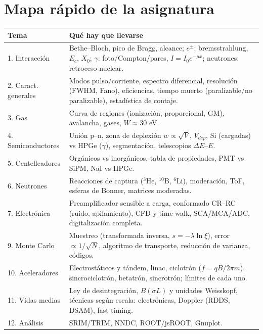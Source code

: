 \section*{Mapa rápido de la asignatura}
\begin{center}\small
\begin{tabularx}{\linewidth}{lX}
\toprule
Tema & Qué hay que llevarse \\
\midrule
1. Interacción & Bethe--Bloch, pico de Bragg, alcance; $e^\pm$: bremsstrahlung, $E_c$, $X_0$; $\gamma$: foto/Compton/pares, $I=I_0e^{-\mu x}$; neutrones: retroceso nuclear.\\
2. Caract. generales & Modos pulso/corriente, espectro diferencial, resolución (FWHM, Fano), eficiencias, tiempo muerto (paralizable/no paralizable), estadística de contaje.\\
3. Gas & Curva de regiones (ionización, proporcional, GM), avalancha, gases, $W\approx 30$ eV.\\
4. Semiconductores & Unión p--n, zona de deplexión $w\propto\sqrt{V}$, $V_{dep}$, Si (cargadas) vs HPGe ($\gamma$), segmentación, telescopios $\Delta E$--$E$.\\
5. Centelleadores & Orgánicos vs inorgánicos, tabla de propiedades, PMT vs SiPM, NaI vs HPGe.\\
6. Neutrones & Reacciones de captura ($^3$He, $^{10}$B, $^6$Li), moderación, ToF, esferas de Bonner, matrices moderadas.\\
7. Electrónica & Preamplificador sensible a carga, conformado CR--RC (ruido, apilamiento), CFD y time walk, SCA/MCA/ADC, digitalización completa.\\
9. Monte Carlo & Muestreo (transformada inversa, $s=-\lambda\ln\xi$), error $\propto1/\sqrt N$, algoritmo de transporte, reducción de varianza, códigos.\\
10. Aceleradores & Electrostáticos y tándem, linac, ciclotrón ($f=qB/2\pi m$), sincrociclotrón, betatrón, sincrotrón; límites de cada uno.\\
11. Vidas medias & Ley de desintegración, $B(\sigma L)$ y unidades Weisskopf, técnicas según escala: electrónicas, Doppler (RDDS, DSAM), fast timing.\\
12. Análisis & SRIM/TRIM, NNDC, ROOT/jsROOT, Gnuplot.\\
\bottomrule
\end{tabularx}
\end{center}
